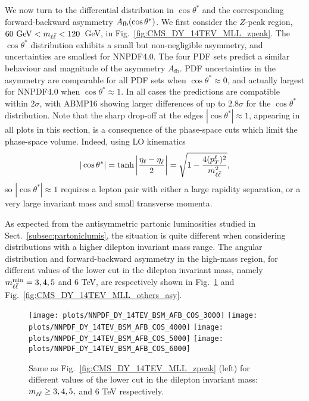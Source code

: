 We now turn to the differential distribution in
  $\cos\theta^*$ 
  and the corresponding forward-backward asymmetry $A_{\rm
    fb}(\cos\theta^*)$.
We first consider the $Z$-peak region, $60~{\rm GeV} < m_{\ell\bar{\ell}} <
120$~GeV, in Fig.~\ref{fig:CMS_DY_14TEV_MLL_zpeak}.
%
The $\cos\theta^*$ 
distribution exhibits a small but non-negligible asymmetry,
and uncertainties are  smallest for NNPDF4.0.
%
The four PDF sets predict a similar behaviour and magnitude
of the asymmetry $A_\mathrm{fb}$.
%
PDF uncertainties in the asymmetry
are  comparable for  all PDF sets when $\cos\theta^* \approx0$,
and actually  largest for NNPDF4.0 when $\cos\theta^* \approx 1$.
In all cases the predictions are compatible within $2 \sigma$,
with ABMP16 showing larger differences of up to $2.8 \sigma$ for the $\cos\theta^*$
distribution.
%
Note that the
sharp drop-off at the edges $|\cos\theta^*| \approx  1$, appearing in
all plots in this section, is a consequence of the phase-space cuts which
limit the phase-space volume.
%
Indeed, using  LO kinematics
\begin{equation}
| \cos\theta^* | = \tanh \left| \frac{\eta_\ell - \eta_{\bar{\ell}}}{2} \right| = \sqrt{1 - \frac{4 (p_T^\ell)^2}{m_{\ell\bar{\ell}}^2}} \text{,}
\end{equation}
so $| \cos\theta^* | \approx 1$ requires a lepton pair with either
a large rapidity separation, or a very large invariant mass and small
transverse momenta. 

As expected from the antisymmetric partonic luminosities studied in
Sect.~\ref{subsec:partoniclumis}, the situation is quite different when
considering distributions with a higher dilepton invariant mass range.
%
The angular distribution and forward-backward asymmetry
in the high-mass region, for different values of the  lower cut in the dilepton
 invariant mass, namely $m_{\ell\bar{\ell}}^{\rm min}=3, 4,5$ and 6 TeV, are
 respectively
 shown in
Fig.~\ref{fig:CMS_DY_14TEV_MLL_others} and Fig.~\ref{fig:CMS_DY_14TEV_MLL_others_asy}.

\begin{figure}[t!]
 \centering
 \texttt{[image: plots/NNPDF\_DY\_14TEV\_BSM\_AFB\_COS\_3000]}
 \texttt{[image: plots/NNPDF\_DY\_14TEV\_BSM\_AFB\_COS\_4000]}
 \texttt{[image: plots/NNPDF\_DY\_14TEV\_BSM\_AFB\_COS\_5000]}
 \texttt{[image: plots/NNPDF\_DY\_14TEV\_BSM\_AFB\_COS\_6000]}
 \caption{Same as Fig.~\ref{fig:CMS_DY_14TEV_MLL_zpeak} (left)
   for different values of the  lower cut in the dilepton
   invariant mass: $m_{\ell\bar{\ell}} \ge 3, 4,5,$ and 6 TeV respectively.
  }    
 \label{fig:CMS_DY_14TEV_MLL_others}
\end{figure}

